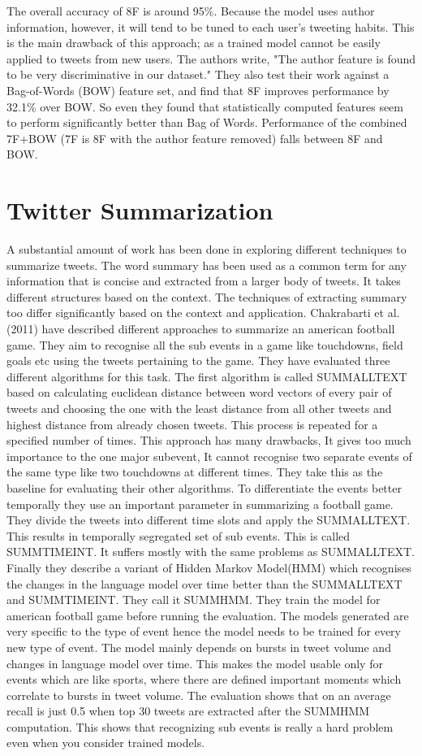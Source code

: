 The overall accuracy of 8F is around 95\%. Because the model uses author information, however, it will tend to be tuned to each user's tweeting habits. This is the main drawback of this approach; as a trained model cannot be easily applied to tweets from new users. The authors write, "The author feature is found to be very discriminative in our dataset." They also test their work against a Bag-of-Words (BOW) feature set, and find that 8F improves performance by 32.1\% over BOW. So even they found that statistically computed features seem to perform significantly better than Bag of Words. Performance of the combined 7F+BOW (7F is 8F with the author feature removed) falls between 8F and BOW. 

\section{Twitter Summarization}
A substantial amount of work has been done in exploring different techniques to summarize tweets. The word summary has been used as a common term for any information that is concise and extracted from a larger body of tweets. It takes different structures based on the context. The techniques of extracting summary too differ significantly based on the context and application. Chakrabarti et al.(2011) have described different approaches to summarize an american football game. They aim to recognise all the sub events in a game like touchdowns, field goals etc using the tweets pertaining to the game. They have evaluated three different algorithms for this task. The first algorithm is called SUMMALLTEXT based on calculating euclidean distance between word vectors of every pair of tweets and choosing the one with the least distance from all other tweets and highest distance from already chosen tweets. This process is repeated for a specified number of times. This approach has many drawbacks, It gives too much importance to the one major subevent, It cannot recognise two separate events of the same type like two touchdowns at different times. They take this as the baseline for evaluating their other algorithms. To differentiate the events better temporally they use an important parameter in summarizing a football game. They divide the tweets into different time slots and apply the SUMMALLTEXT. This results in temporally segregated set of sub events. This is called SUMMTIMEINT. It suffers mostly with the same problems as SUMMALLTEXT. Finally they describe a variant of Hidden Markov Model(HMM) which recognises the changes in the language model over time better than the SUMMALLTEXT and SUMMTIMEINT. They call it SUMMHMM. They train the model for american football game before running the evaluation. The models generated are very specific to the type of event hence the model needs to be trained for every new type of event. The model mainly depends on bursts in tweet volume and changes in language model over time. This makes the model usable only for events which are like sports, where there are defined important moments which correlate to bursts in tweet volume. The evaluation shows that on an average recall is just 0.5 when top 30 tweets are extracted after the SUMMHMM computation. This shows that recognizing sub events is really a hard problem even when you consider trained models.

